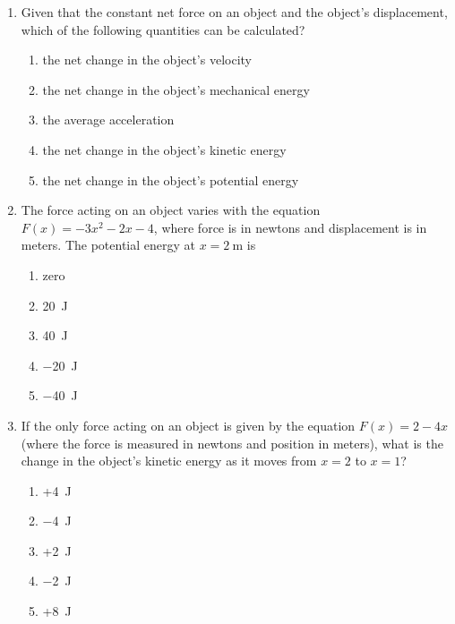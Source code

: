 \documentclass{../../../oss-apphys}
\begin{document}
\begin{multicols}{2}
\begin{enumerate}[leftmargin=18pt,resume]
  \item Given that the constant net force on an object and the object's 
    displacement, which of the following quantities can be calculated?
    \begin{enumerate}[noitemsep,topsep=0pt,leftmargin=18pt,label=(\Alph*)]
    \item the net change in the object's velocity
    \item the net change in the object's mechanical energy
    \item the average acceleration
    \item the net change in the object's kinetic energy
    \item the net change in the object's potential energy
    \end{enumerate}
    
  \item The force acting on an object varies with the equation
    $F(x)=-3x^2-2x-4$, where force is in newtons and displacement is in meters.
    The potential energy at $x=\SI{2}{\metre}$ is
    \begin{enumerate}[noitemsep,topsep=0pt,leftmargin=18pt,label=(\Alph*)]
    \item zero
    \item\SI{20}{\joule}
    \item\SI{40}{\joule}
    \item\SI{-20}{\joule}
    \item\SI{-40}{\joule}
    \end{enumerate}
    
  \item If the only force acting on an object is given by the equation
    $F(x)=2-4x$ (where the force is measured in newtons and position in meters),
    what is the change in the object's kinetic energy as it moves from $x=2$ to
    $x=1$?
    \begin{enumerate}[noitemsep,topsep=0pt,leftmargin=18pt,label=(\Alph*)]
    \item +\SI{4}{\joule}
    \item \SI{-4}{\joule}
    \item +\SI{2}{\joule}
    \item \SI{-2}{\joule}
    \item +\SI{8}{\joule}
    \end{enumerate}
    

\end{enumerate}
\end{multicols}
\end{document}
